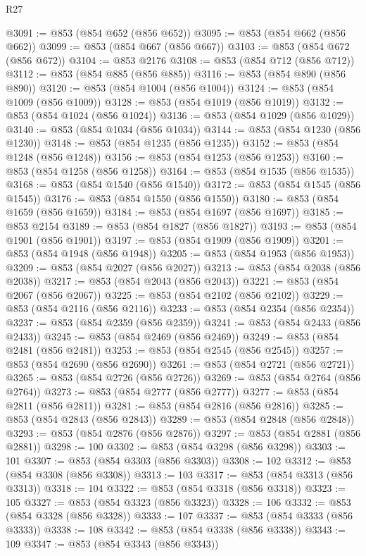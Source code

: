 \begin{lexlean}{R27}
\begin{coremodule}
@3091 := @853 (@854 @652 (@856 @652))
@3095 := @853 (@854 @662 (@856 @662))
@3099 := @853 (@854 @667 (@856 @667))
@3103 := @853 (@854 @672 (@856 @672))
@3104 := @853 @2176
@3108 := @853 (@854 @712 (@856 @712))
@3112 := @853 (@854 @885 (@856 @885))
@3116 := @853 (@854 @890 (@856 @890))
@3120 := @853 (@854 @1004 (@856 @1004))
@3124 := @853 (@854 @1009 (@856 @1009))
@3128 := @853 (@854 @1019 (@856 @1019))
@3132 := @853 (@854 @1024 (@856 @1024))
@3136 := @853 (@854 @1029 (@856 @1029))
@3140 := @853 (@854 @1034 (@856 @1034))
@3144 := @853 (@854 @1230 (@856 @1230))
@3148 := @853 (@854 @1235 (@856 @1235))
@3152 := @853 (@854 @1248 (@856 @1248))
@3156 := @853 (@854 @1253 (@856 @1253))
@3160 := @853 (@854 @1258 (@856 @1258))
@3164 := @853 (@854 @1535 (@856 @1535))
@3168 := @853 (@854 @1540 (@856 @1540))
@3172 := @853 (@854 @1545 (@856 @1545))
@3176 := @853 (@854 @1550 (@856 @1550))
@3180 := @853 (@854 @1659 (@856 @1659))
@3184 := @853 (@854 @1697 (@856 @1697))
@3185 := @853 @2154
@3189 := @853 (@854 @1827 (@856 @1827))
@3193 := @853 (@854 @1901 (@856 @1901))
@3197 := @853 (@854 @1909 (@856 @1909))
@3201 := @853 (@854 @1948 (@856 @1948))
@3205 := @853 (@854 @1953 (@856 @1953))
@3209 := @853 (@854 @2027 (@856 @2027))
@3213 := @853 (@854 @2038 (@856 @2038))
@3217 := @853 (@854 @2043 (@856 @2043))
@3221 := @853 (@854 @2067 (@856 @2067))
@3225 := @853 (@854 @2102 (@856 @2102))
@3229 := @853 (@854 @2116 (@856 @2116))
@3233 := @853 (@854 @2354 (@856 @2354))
@3237 := @853 (@854 @2359 (@856 @2359))
@3241 := @853 (@854 @2433 (@856 @2433))
@3245 := @853 (@854 @2469 (@856 @2469))
@3249 := @853 (@854 @2481 (@856 @2481))
@3253 := @853 (@854 @2545 (@856 @2545))
@3257 := @853 (@854 @2690 (@856 @2690))
@3261 := @853 (@854 @2721 (@856 @2721))
@3265 := @853 (@854 @2726 (@856 @2726))
@3269 := @853 (@854 @2764 (@856 @2764))
@3273 := @853 (@854 @2777 (@856 @2777))
@3277 := @853 (@854 @2811 (@856 @2811))
@3281 := @853 (@854 @2816 (@856 @2816))
@3285 := @853 (@854 @2843 (@856 @2843))
@3289 := @853 (@854 @2848 (@856 @2848))
@3293 := @853 (@854 @2876 (@856 @2876))
@3297 := @853 (@854 @2881 (@856 @2881))
@3298 := 100
@3302 := @853 (@854 @3298 (@856 @3298))
@3303 := 101
@3307 := @853 (@854 @3303 (@856 @3303))
@3308 := 102
@3312 := @853 (@854 @3308 (@856 @3308))
@3313 := 103
@3317 := @853 (@854 @3313 (@856 @3313))
@3318 := 104
@3322 := @853 (@854 @3318 (@856 @3318))
@3323 := 105
@3327 := @853 (@854 @3323 (@856 @3323))
@3328 := 106
@3332 := @853 (@854 @3328 (@856 @3328))
@3333 := 107
@3337 := @853 (@854 @3333 (@856 @3333))
@3338 := 108
@3342 := @853 (@854 @3338 (@856 @3338))
@3343 := 109
@3347 := @853 (@854 @3343 (@856 @3343))

\end{coremodule}
\end{lexlean}

